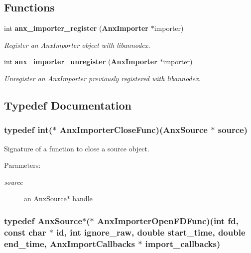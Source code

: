 \subsection*{Functions}
\begin{CompactItemize}
\item 
int {\bf anx\_\-importer\_\-register} ({\bf Anx\-Importer} $\ast$importer)
\begin{CompactList}\small\item\em Register an Anx\-Importer object with libannodex. \item\end{CompactList}\item 
int {\bf anx\_\-importer\_\-unregister} ({\bf Anx\-Importer} $\ast$importer)
\begin{CompactList}\small\item\em Unregister an Anx\-Importer previously registered with libannodex. \item\end{CompactList}\end{CompactItemize}


\subsection{Typedef Documentation}
\subsubsection{\setlength{\rightskip}{0pt plus 5cm}typedef int($\ast$ {\bf Anx\-Importer\-Close\-Func})({\bf Anx\-Source} $\ast$ source)}\label{anx__import_8h_a7}


Signature of a function to close a source object. 

\begin{Desc}
\item[Parameters:]
\begin{description}
\item[{\em source}]an Anx\-Source$\ast$ handle \end{description}
\end{Desc}
\subsubsection{\setlength{\rightskip}{0pt plus 5cm}typedef {\bf Anx\-Source}$\ast$($\ast$ {\bf Anx\-Importer\-Open\-FDFunc})(int fd, const char $\ast$ id, int ignore\_\-raw, double start\_\-time, double end\_\-time, Anx\-Import\-Callbacks $\ast$ import\_\-callbacks)}\label{anx__import_8h_a4}


